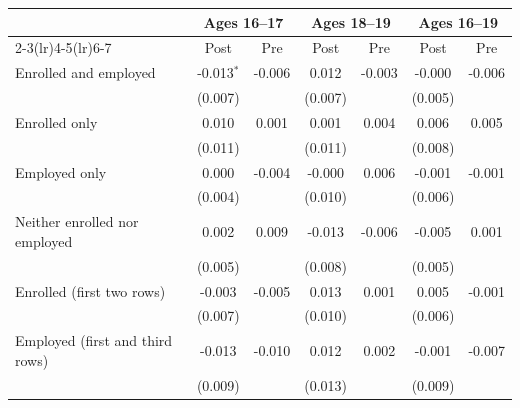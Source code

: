 \begin{tabular}{lcccccc}
\toprule
 & \multicolumn{2}{c}{Ages 16--17} & \multicolumn{2}{c}{Ages 18--19} & \multicolumn{2}{c}{Ages 16--19} \\
\cmidrule(lr){2-3}\cmidrule(lr){4-5}\cmidrule(lr){6-7}
 & Post & Pre & Post & Pre & Post & Pre \\
\midrule
Enrolled and employed & -0.013$^{*}$ & -0.006 & 0.012 & -0.003 & -0.000 & -0.006 \\
 & (0.007) &  & (0.007) &  & (0.005) &  \\
Enrolled only & 0.010 & 0.001 & 0.001 & 0.004 & 0.006 & 0.005 \\
 & (0.011) &  & (0.011) &  & (0.008) &  \\
Employed only & 0.000 & -0.004 & -0.000 & 0.006 & -0.001 & -0.001 \\
 & (0.004) &  & (0.010) &  & (0.006) &  \\
Neither enrolled nor employed & 0.002 & 0.009 & -0.013 & -0.006 & -0.005 & 0.001 \\
 & (0.005) &  & (0.008) &  & (0.005) &  \\
Enrolled (first two rows) & -0.003 & -0.005 & 0.013 & 0.001 & 0.005 & -0.001 \\
 & (0.007) &  & (0.010) &  & (0.006) &  \\
Employed (first and third rows) & -0.013 & -0.010 & 0.012 & 0.002 & -0.001 & -0.007 \\
 & (0.009) &  & (0.013) &  & (0.009) &  \\
\bottomrule
\end{tabular}
